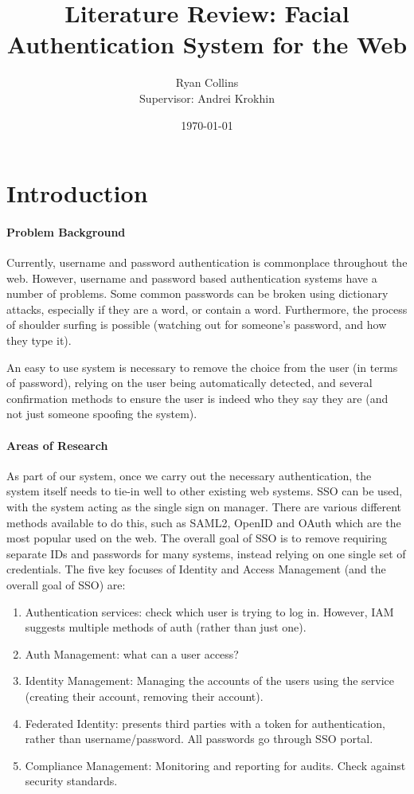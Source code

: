 \documentclass[14pt]{article}
\title{Literature Review: Facial Authentication System for the Web}
\author{
        Ryan Collins\\
        Supervisor: Andrei Krokhin
}
\date{\today}
\begin{document}
\maketitle

\section{Introduction}
\paragraph{Problem Background}
Currently, username and password authentication is commonplace throughout the web. However, username and password
based authentication systems have a number of problems. Some common passwords can be broken using dictionary attacks,
especially if they are a word, or contain a word. Furthermore, the process of shoulder surfing is possible (watching out
for someone's password, and how they type it).

An easy to use system is necessary to remove the choice from the user (in terms of password), relying on the user being automatically
detected, and several confirmation methods to ensure the user is indeed who they say they are (and not just someone spoofing the system).

\paragraph{Areas of Research}




As part of our system, once we carry out the necessary authentication, the system itself needs to tie-in well to
other existing web systems. SSO can be used, with the system acting as the single sign on manager. There are various
different methods available to do this, such as SAML2, OpenID and OAuth which are the most popular used on the web. 
The overall goal of SSO is to remove requiring separate IDs and passwords for many systems, instead relying on one single
set of credentials. The five key focuses of Identity and Access Management (and the overall goal of SSO) are:

\begin{enumerate}
  \item Authentication services: check which user is trying to log in. However, IAM suggests multiple methods of auth (rather than just one).
  \item Auth Management: what can a user access?
  \item Identity Management: Managing the accounts of the users using the service (creating their account, removing their account).
  \item Federated Identity: presents third parties with a token for authentication, rather than username/password. All passwords go through SSO portal.
  \item Compliance Management: Monitoring and reporting for audits. Check against security standards.
\end{enumerate}
\cite{SSOOverview}
\end{document}
